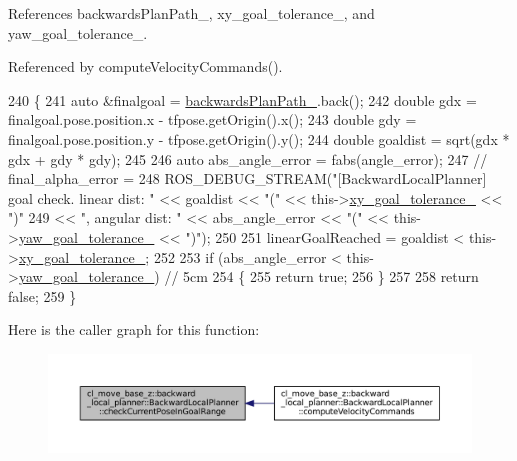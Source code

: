 References backwards\+Plan\+Path\+\_\+, xy\+\_\+goal\+\_\+tolerance\+\_\+, and yaw\+\_\+goal\+\_\+tolerance\+\_\+.



Referenced by compute\+Velocity\+Commands().


\begin{DoxyCode}
240         \{
241             \textcolor{keyword}{auto} &finalgoal = \hyperlink{classcl__move__base__z_1_1backward__local__planner_1_1BackwardLocalPlanner_ad9cde5c85f782cab2ddb4030e3c3f2cf}{backwardsPlanPath\_}.back();
242             \textcolor{keywordtype}{double} gdx = finalgoal.pose.position.x - tfpose.getOrigin().x();
243             \textcolor{keywordtype}{double} gdy = finalgoal.pose.position.y - tfpose.getOrigin().y();
244             \textcolor{keywordtype}{double} goaldist = sqrt(gdx * gdx + gdy * gdy);
245 
246             \textcolor{keyword}{auto} abs\_angle\_error = fabs(angle\_error);
247             \textcolor{comment}{// final\_alpha\_error =}
248             ROS\_DEBUG\_STREAM(\textcolor{stringliteral}{"[BackwardLocalPlanner] goal check. linear dist: "} << goaldist << \textcolor{stringliteral}{"("} << 
      this->\hyperlink{classcl__move__base__z_1_1backward__local__planner_1_1BackwardLocalPlanner_aa4ec2c87947a3c08f8278eff052e7c8c}{xy\_goal\_tolerance\_} << \textcolor{stringliteral}{")"}
249                                                                                 << \textcolor{stringliteral}{", angular dist: "} << 
      abs\_angle\_error << \textcolor{stringliteral}{"("} << this->\hyperlink{classcl__move__base__z_1_1backward__local__planner_1_1BackwardLocalPlanner_a9c5104d328041fcde5a3c02664abad48}{yaw\_goal\_tolerance\_} << \textcolor{stringliteral}{")"});
250 
251             linearGoalReached = goaldist < this->\hyperlink{classcl__move__base__z_1_1backward__local__planner_1_1BackwardLocalPlanner_aa4ec2c87947a3c08f8278eff052e7c8c}{xy\_goal\_tolerance\_};
252 
253             \textcolor{keywordflow}{if} (abs\_angle\_error < this->\hyperlink{classcl__move__base__z_1_1backward__local__planner_1_1BackwardLocalPlanner_a9c5104d328041fcde5a3c02664abad48}{yaw\_goal\_tolerance\_}) \textcolor{comment}{// 5cm}
254             \{
255                 \textcolor{keywordflow}{return} \textcolor{keyword}{true};
256             \}
257 
258             \textcolor{keywordflow}{return} \textcolor{keyword}{false};
259         \}
\end{DoxyCode}
Here is the caller graph for this function\+:
\nopagebreak
\begin{figure}[H]
\begin{center}
\leavevmode
\includegraphics[width=350pt]{classcl__move__base__z_1_1backward__local__planner_1_1BackwardLocalPlanner_a8b84e3961a79317a9c978ec054e4a112_icgraph}
\end{center}
\end{figure}

